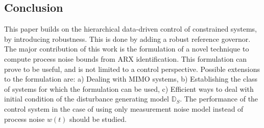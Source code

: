 \documentclass[letterpaper, 10 pt, conference]{ieeeconf}  %
\begin{document}
\begin{enumerate}
	\section{Conclusion}
	This paper builds on the hierarchical data-driven control of constrained systems, by introducing robustness. This is done by adding a robust reference governor. The major contribution of this work is the formulation of a novel technique to compute process noise bounds from ARX identification. This formulation can prove to be useful, and is not limited to a control perspective. Possible extensions to the formulation are: a) Dealing with MIMO systems, b) Establishing the class of systems for which the formulation can be used, c) Efficient ways to deal with initial condition of the disturbance generating model $\mathbb{D}_S$. The performance of the control system in the case of using only measurement noise model instead of process noise $w(t)$ should be studied.
\end{enumerate} 

	
                                                              



\end{document}
